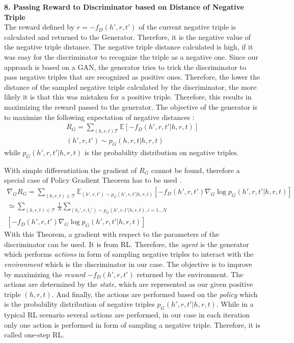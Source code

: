 \textbf{8. Passing Reward to Discriminator based on Distance of Negative Triple}\\
%
The reward defined by $r = - f_D(h',r,t')$ of the current negative triple is calculated and returned to the Generator.
Therefore, it is the negative value of the negative triple distance.
The negative triple distance calculated is high, if it was easy for the discriminator to recognize the triple as a negative one.
Since our approach is based on a \ac{GAN}, the generator tries to trick the discriminator to pass negative triples that are recognized as positive ones.
Therefore, the lower the distance of the sampled negative triple calculated by the discriminator, the more likely it is that this was mistaken for a positive triple.
Therefore, this results in maximizing the reward passed to the generator.
The objective of the generator is to maximize the following expectation of negative distances \cite{cai2017kbgan}:
\begin{multline}
    R_G = \sum_{(h,r,t) \mathcal{T}}{\mathbb{E}[-f_D(h',r,t'|h,r,t)]}\\
    (h',r,t') \sim p_G(h,r,t|h,r,t) 
\end{multline}
while $p_G(h', r, t'|h, r, t)$ is the probability distribution on negative triples.

With simple differentiation the gradient of $R_G$ cannot be found, therefore a special case of Policy Gradient Theorem has to be used \cite{cai2017kbgan}.
\begin{multline}
    \nabla_G R_G=\sum_{(h,r,t)\in\mathcal{T}}\mathbb{E}_{(h',r,t')\sim p_G(h',r,t'|h,r,t)}
    [-f_D(h',r,t')\nabla_G \log p_G(h',r,t'|h,r,t)] \\
    \simeq \sum_{(h,r,t)\in\mathcal{T}}\frac{1}{N}\sum_{(h_i',r,t_i')\sim p_G(h',r,t'|h,r,t), i=1\dots N} \\
    [-f_D(h',r,t')\nabla_G \log p_G(h',r,t'|h,r,t)]
\end{multline}
With this Theorem, a gradient with respect to the parameters of the discriminator can be used.
It is from \ac{RL}.
Therefore, the \textit{agent} is the generator which performs \textit{actions} in form of sampling negative triples to interact with the \textit{environment} which is the discriminator in our case.
The objective is to improve by maximizing the \textit{reward} $-f_D(h',r,t')$ returned by the environment.
The actions are determined by the \textit{state}, which are represented as our given positive triple $(h,r,t)$.
And finally, the actions are performed based on the \textit{policy} which is the probability distribution of negative triples $p_G(h',r,t'|h,r,t)$.
While in a typical \ac{RL} scenario several actions are performed, in our case in each iteration only one action is performed in form of sampling a negative triple.
Therefore, it is called one-step \ac{RL}.


